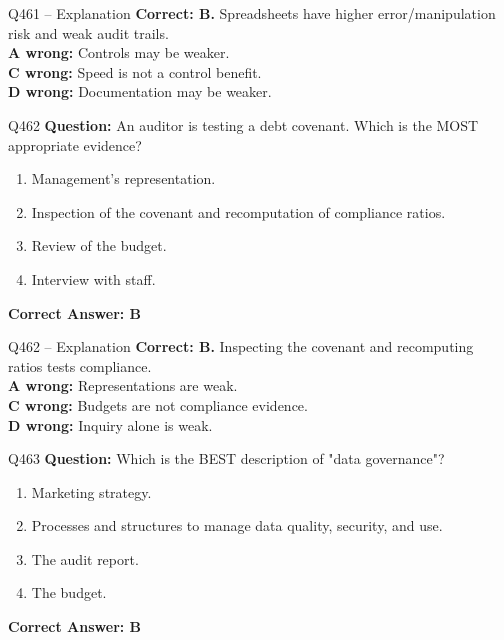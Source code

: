 \documentclass[aspectratio=169,10pt]{beamer}
\begin{document}
	\begin{frame}[t]{Q461 -- Explanation}
		\small
		\textbf{Correct: B.} Spreadsheets have higher error/manipulation risk and weak audit trails. \\[4pt]
		\textbf{A wrong:} Controls may be weaker. \\[2pt]
		\textbf{C wrong:} Speed is not a control benefit. \\[2pt]
		\textbf{D wrong:} Documentation may be weaker.
	\end{frame}
	
	\begin{frame}[t]{Q462}
		\small
		\textbf{Question:} An auditor is testing a debt covenant. Which is the MOST appropriate evidence?
		\begin{enumerate}[label=\Alph*.,itemsep=1pt,topsep=2pt]
			\item Management's representation.
			\item Inspection of the covenant and recomputation of compliance ratios.
			\item Review of the budget.
			\item Interview with staff.
		\end{enumerate}
		\vspace{4pt}
		\textbf{Correct Answer: B}
	\end{frame}
	
	\begin{frame}[t]{Q462 -- Explanation}
		\small
		\textbf{Correct: B.} Inspecting the covenant and recomputing ratios tests compliance. \\[4pt]
		\textbf{A wrong:} Representations are weak. \\[2pt]
		\textbf{C wrong:} Budgets are not compliance evidence. \\[2pt]
		\textbf{D wrong:} Inquiry alone is weak.
	\end{frame}
	
	\begin{frame}[t]{Q463}
		\small
		\textbf{Question:} Which is the BEST description of "data governance"?
		\begin{enumerate}[label=\Alph*.,itemsep=1pt,topsep=2pt]
			\item Marketing strategy.
			\item Processes and structures to manage data quality, security, and use.
			\item The audit report.
			\item The budget.
		\end{enumerate}
		\vspace{4pt}
		\textbf{Correct Answer: B}
	\end{frame}
	
\end{document}

